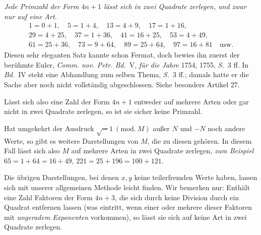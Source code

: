 \textit{Jede Primzahl der Form $4n+1$ lässt sich in zwei Quadrate zerlegen, und zwar nur auf eine Art.}
\[
\begin{gathered}
1=0+1,\quad5=1+4,\quad13=4+9,\quad17=1+16,\\
29=4+25,\quad37=1+36,\quad41=16+25,\quad53=4+49,\\
61=25+36,\quad73=9+64,\quad89=25+64,\quad97=16+81\quad\text{usw.}
\end{gathered}
\]
Diesen sehr eleganten Satz kannte schon Fermat, doch bewies ihn zuerst der berühmte Euler, \textit{Comm. nov. Petr. Bd.}\ V, \textit{für die Jahre} 1754, 1755, \textit{S.}\ 3 ff. In \textit{Bd.}\ IV steht eine Abhandlung zum selben Thema, \textit{S.}\ 3 ff.; damals hatte er die Sache aber noch nicht vollständig abgeschlossen. Siehe besonders Artikel 27.

Lässt sich also eine Zahl der Form $4n+1$ entweder auf mehrere Arten oder gar nicht in zwei Quadrate zerlegen, so ist sie sicher keine Primzahl.

Hat umgekehrt der Ausdruck $\surd-1\ (\mathrm{mod.}\ M)$ außer $N$ und $-N$ noch andere Werte, so gibt es weitere Darstellungen von $M$, die zu diesen gehören. In diesem Fall lässt sich also $M$ auf mehrere Arten in zwei Quadrate zerlegen, \textit{zum Beispiel} $65=1+64=16+49$, $221=25+196=100+121$.

Die übrigen Darstellungen, bei denen $x,y$ keine teilerfremden Werte haben, lassen sich mit unserer allgemeinen Methode leicht finden. Wir bemerken nur: Enthält eine Zahl Faktoren der Form $4n+3$, die sich durch keine Division durch ein Quadrat entfernen lassen (was eintritt, wenn einer oder mehrere dieser Faktoren mit \textit{ungeradem Exponenten} vorkommen), so lässt sie sich auf keine Art in zwei Quadrate zerlegen.

